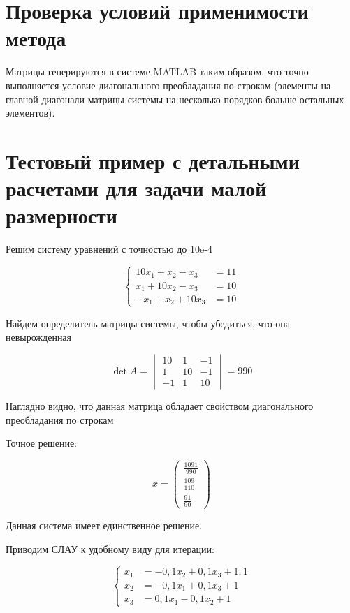\section{Проверка условий применимости метода}

Матрицы генерируются в системе MATLAB таким образом, что точно выполняется условие диагонального преобладания по строкам (элементы на главной диагонали матрицы системы на несколько порядков больше остальных элементов).

\section{Тестовый пример с детальными расчетами для задачи малой размерности}

Решим систему уравнений с точностью до 10e-4

\begin{equation*}
	\begin{cases}
		10x_{1}+x_{2}-x_{3}&=11\\
		x_{1}+10x_{2}-x_{3}&=10\\
		-x_{1}+x_{2}+10x_{3}&=10
	\end{cases}
\end{equation*}

Найдем определитель матрицы системы, чтобы убедиться, что она невырожденная 

\begin{equation*}
	\det A =
	\begin{vmatrix}
		10 & 1 & -1\\
		1 & 10 & -1\\
		-1 & 1 & 10
	\end{vmatrix}
	= 990
\end{equation*}

Наглядно видно, что данная матрица обладает свойством диагонального преобладания по строкам

Точное решение:

\begin{equation*}
	x =
	\begin{pmatrix}
		\frac{1091}{990}\\
		\frac{109}{110}\\
		\frac{91}{90}
	\end{pmatrix}
\end{equation*}

Данная система имеет единственное решение.

Приводим СЛАУ к удобному виду для итерации:

\begin{equation*}
	\begin{cases}
		x_{1}&=-0,1x_{2}+0,1x_{3}+1,1\\
		x_{2}&=-0,1x_{1}+0,1x_{3}+1\\
		x_{3}&=0,1x_{1}-0,1x_{2}+1
	\end{cases}
\end{equation*}

